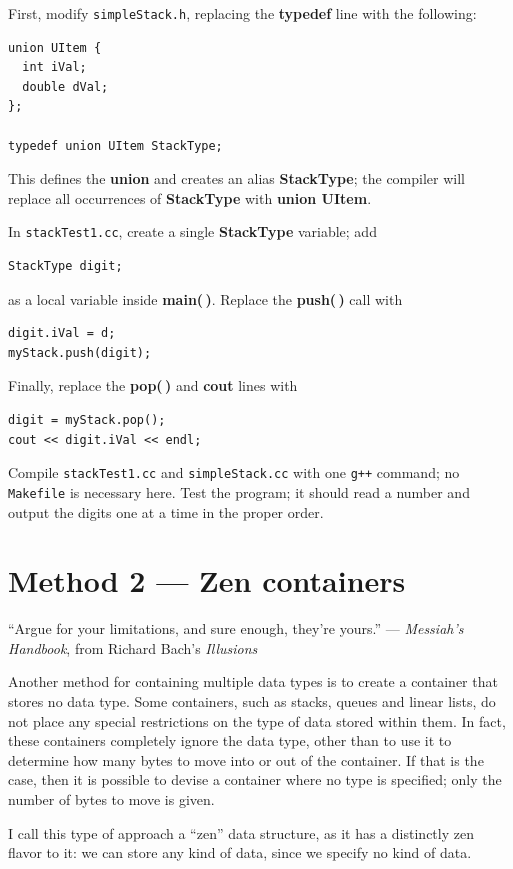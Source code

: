 \documentclass{article}
\begin{document}
First, modify {\tt simpleStack.h}, replacing the {\bf typedef} line with the
following:
\begin{lstlisting}
union UItem {
  int iVal;
  double dVal;
};

typedef union UItem StackType;
\end{lstlisting}
\vskip6pt
This defines the {\bf union} and creates an alias {\bf StackType}; the compiler
will replace all occurrences of {\bf StackType} with {\bf union UItem}.\parend

In {\tt stackTest1.cc}, create a single {\bf StackType} variable; add
\begin{lstlisting}
StackType digit;
\end{lstlisting}
as a local variable inside {\bf main(\,)}. Replace the {\bf push(\,)} call with
\begin{lstlisting}
digit.iVal = d;
myStack.push(digit);
\end{lstlisting}
\vskip6pt
Finally, replace the {\bf pop(\,)} and {\bf cout} lines with
\begin{lstlisting}
digit = myStack.pop();
cout << digit.iVal << endl;
\end{lstlisting}
\vskip6pt
Compile {\tt stackTest1.cc} and {\tt simpleStack.cc} with one {\tt g++} command;
no {\tt Makefile} is necessary here. Test the program; it should read a number
and output the digits one at a time in the proper order.

\section{Method 2 --- Zen containers}
``Argue for your limitations, and sure enough, they're yours.'' ---
\emph{Messiah's Handbook}, from Richard Bach's \emph{Illusions}\parend

Another method for containing multiple data types is to create a container that
stores no data type. Some containers, such as stacks, queues and linear lists,
do not place any special restrictions on the type of data stored within them. In
fact, these containers completely ignore the data type, other than to use it to
determine how many bytes to move into or out of the container. If that is the
case, then it is possible to devise a container where no type is specified; only
the number of bytes to move is given.\parend

I call this type of approach a ``zen'' data structure, as it has a distinctly
zen flavor to it: we can store any kind of data, since we specify no kind of
data.\parend
\end{document}
